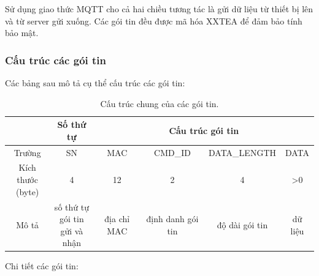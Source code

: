 \documentclass[a4paper,12pt,oneside]{article}
\begin{document}
\noindent Sử dụng giao thức MQTT cho cả hai chiều tương tác là gửi dữ liệu từ thiết bị lên và từ server gửi xuống. Các gói tin đều được mã hóa XXTEA để đảm bảo tính bảo mật.
\subsubsection{Cấu trúc các gói tin}
\noindent Các bảng sau mô tả cụ thể cấu trúc các gói tin:
\begin{table}[H]
\begin{tabular}{|c|c|c|c|c|c|}
\hline 
 & Số thứ tự & \multicolumn{4}{|c|}{Cấu trúc gói tin} \\ 
\hline 
Trường & SN & MAC & CMD\_ID & DATA\_LENGTH  & DATA \\ 
\hline 
\makecell{Kích thước\\ (byte)} & 4 & 12 & 2 & 4 & >0 \\ 
\hline 
Mô tả & \makecell{số thứ tự \\ gói tin\\ gửi và nhận} & địa chỉ MAC & định danh gói tin & độ dài gói tin & dữ liệu \\ 
\hline 
\end{tabular} 
\caption{Cấu trúc chung của các gói tin.}
\end{table}

\noindent Chi tiết các gói tin:
\end{document}
